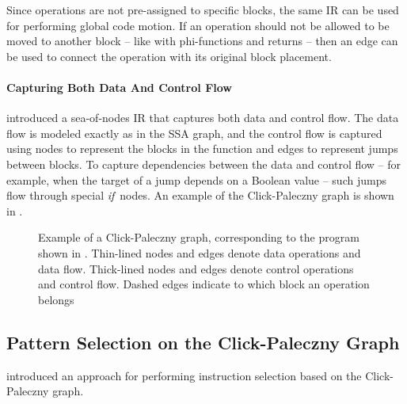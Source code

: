 Since \glspl{operation} are not pre-assigned to specific \glspl{block}, the same
\gls{IR} can be used for performing \gls{global code motion}.
%
If an \gls{operation} should not be allowed to be moved to another \gls{block}
-- like with \glspl{phi-function} and returns -- then an \gls{edge} can be used
to connect the \gls{operation} with its original \gls{block} placement.


\paragraph{Capturing Both Data And Control Flow}

\textcite{ClickPaleczny:1995} introduced a \gls{sea-of-nodes IR} that captures
both data and control flow.
%
The data flow is modeled exactly as in the \gls{SSA graph}, and the control flow
is captured using \glspl{node} to represent the \glspl{block} in the
\gls{function} and \glspl{edge} to represent jumps between \glspl{block}.
%
To capture dependencies between the data and control flow -- for example, when
the target of a jump depends on a Boolean value -- such jumps flow through
special \emph{if}~\glspl{node}.
%
An example of the \gls{Click-Paleczny graph} is shown in
.

\begin{figure}
  \centering%
  

  \caption[Example of a Click-Paleczny graph]%
          {%
            Example of a Click-Paleczny graph, corresponding to the program
            shown in .
            Thin-lined nodes and edges denote data operations and data flow.
            Thick-lined nodes and edges denote control operations and control
            flow.
            Dashed edges indicate to which block an operation belongs%
          }
\end{figure}


\subsection{Pattern Selection on the Click-Paleczny Graph}

\textcite{PalecznyEtAl:2001} introduced an approach for performing
\gls{instruction selection} based on the \gls{Click-Paleczny graph}.

